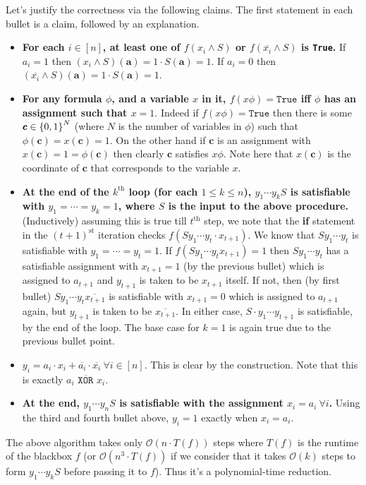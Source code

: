 \begin{enumerate}[leftmargin=*]
Let's justify the correctness via the following claims. The first statement in each bullet is a claim, followed by an explanation.
\begin{itemize}
\item \textbf{For each $i\in[n]$, at least one of $f(x_{i}\land S)$ or $f(\overline{x_{i}}\land S)$ is \texttt{True}.} If $a_{i}=1$ then $\left(x_{i}\land S\right)(\pmb a) = 1\cdot S(\pmb a) = 1$. 
If $a_{i}=0$ then $\left(\overline{x_{i}}\land S\right)(\pmb a) = 1\cdot S(\pmb a) = 1$.
\item \textbf{For any formula $\phi$, and a variable $x$ in it, $f(x\phi)=\texttt{True}$ iff $\phi$ has an assignment such that $x=1$}. Indeed if $f(x\phi)=\texttt{True}$ then there is some $\pmb c\in \left\{0,1\right\}^{N}$ (where $N$ is the number of variables in $\phi$) such that $\phi(\pmb c) = x(\pmb c) = 1$. On the other hand if $\pmb c$ is an assignment with $x(\pmb c) = 1 = \phi(\pmb c)$ then clearly $\pmb c$ satisfies $x\phi$. Note here that $x(\pmb c)$ is the coordinate of $\pmb c$ that corresponds to the variable $x$.
\item \textbf{At the end of the $k^{\text{th}}$ loop (for each $1\le k\le n$), $y_{1}\cdots y_{k}S$ is satisfiable with $y_{1}=\cdots=y_{k}=1$, where $S$ is the input to the above procedure.} (Inductively) assuming this is true till $t^{\text{th}}$ step, we note that the \textbf{if} statement in the $(t+1)^{\text{st}}$ iteration checks $f(S y_{1}\cdots y_{t} \cdot x_{t+1})$. We know that $Sy_{1}\cdots y_{t}$ is satisfiable with $y_{1}=\cdots =y_{t} = 1$. If $f(S y_{1}\cdots y_{t} x_{t+1})=1$ then $Sy_{1}\cdots y_{t}$ has a satisfiable assignment with $x_{t+1}=1$ (by the previous bullet) which is assigned to $a_{t+1}$ and $y_{t+1}$ is taken to be $x_{t+1}$ itself. 
If not, then (by first bullet) $Sy_{1}\cdots y_{t}  \overline{x_{t+1}}$ is satisfiable with $x_{t+1}=0$ which is assigned to $a_{t+1}$ again, but $y_{t+1}$ is taken to be $\overline{x_{t+1}}$. In either case, $S\cdot y_{1}\cdots y_{t+1}$ is satisfiable, by the end of the loop. The base case for $k=1$ is again true due to the previous bullet point.
\item \textbf{$y_{i} = a_{i}\cdot x_{i}+\overline{a_{i}}\cdot \overline{x_{i}}~\forall i\in[n]$}. This is clear by the construction. Note that this is exactly $\overline{a_{i}\texttt{ XOR }x_{i}}$.
\item \textbf{At the end, $y_{1}\cdots y_{n}S$ is satisfiable with the assignment  $x_{i}=a_{i}~\forall i$.} Using the third and fourth bullet above, $y_{i}=1$ exactly when $x_{i}=a_{i}$.
\end{itemize}
The above algorithm takes only $\mathcal O(n \cdot T(f))$ steps where $T(f)$ is the runtime of the blackbox $f$ (or $\mathcal O(n^{3} \cdot T(f))$ if we consider that it takes $\mathcal O(k)$ steps to form $y_{1}\cdots y_{k}S$ before passing it to $f$). Thus it's a polynomial-time reduction.


\end{enumerate}
